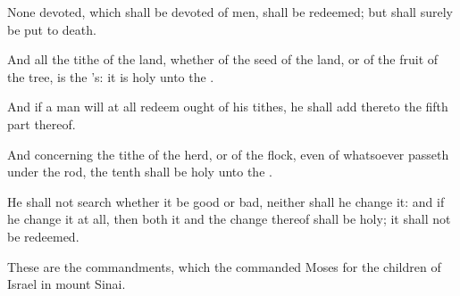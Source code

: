 \Verse None devoted, which shall be devoted of men, shall be redeemed; but shall surely be put to death.

\Verse And all the tithe of the land, whether of the seed of the land, or of the fruit of the tree, is the \LORD's: it is holy unto the \LORD.

\Verse And if a man will at all redeem ought of his tithes, he shall add thereto the fifth part thereof.

\Verse And concerning the tithe of the herd, or of the flock, even of whatsoever passeth under the rod, the tenth shall be holy unto the \LORD.

\Verse He shall not search whether it be good or bad, neither shall he change it: and if he change it at all, then both it and the change thereof shall be holy; it shall not be redeemed.

\Verse These are the commandments, which the \LORD commanded Moses for the children of Israel in mount Sinai.

